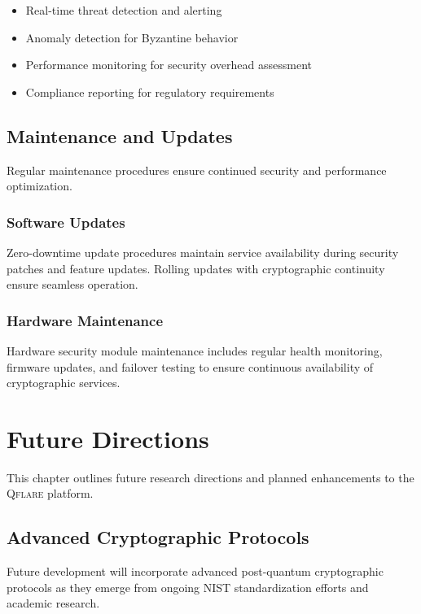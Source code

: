 ﻿\documentclass[12pt,a4paper,twoside]{book}
\newcommand{\qflare}{\textsc{Qflare}}
\begin{document}
\begin{itemize}
\item Real-time threat detection and alerting
\item Anomaly detection for Byzantine behavior
\item Performance monitoring for security overhead assessment
\item Compliance reporting for regulatory requirements
\end{itemize}

\section{Maintenance and Updates}
\label{sec:maintenance}

Regular maintenance procedures ensure continued security and performance optimization.

\subsection{Software Updates}
\label{subsec:software-updates}

Zero-downtime update procedures maintain service availability during security patches and feature updates. Rolling updates with cryptographic continuity ensure seamless operation.

\subsection{Hardware Maintenance}
\label{subsec:hardware-maintenance}

Hardware security module maintenance includes regular health monitoring, firmware updates, and failover testing to ensure continuous availability of cryptographic services.

\chapter{Future Directions}
\label{ch:future}

This chapter outlines future research directions and planned enhancements to the \qflare{} platform.

\section{Advanced Cryptographic Protocols}
\label{sec:advanced-crypto}

Future development will incorporate advanced post-quantum cryptographic protocols as they emerge from ongoing NIST standardization efforts and academic research.
\end{document}
